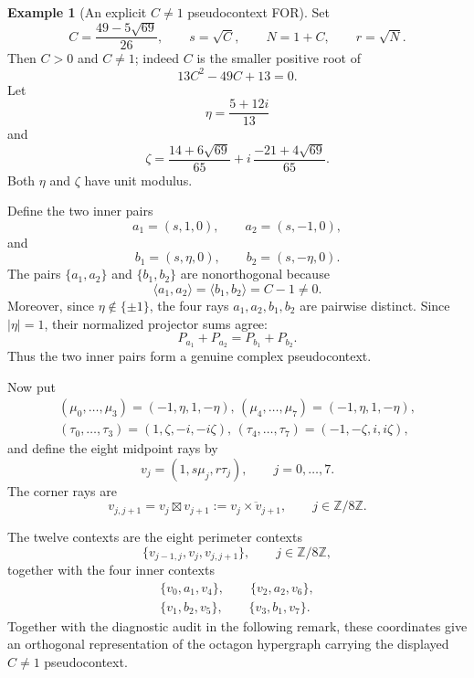 \documentclass[
  twocolumn,
  aps,
  pra,
  floatfix,
  amsmath,amssymb,
  longbibliography
]{revtex4-2}
\theoremstyle{definition}
\newtheorem{example}[theorem]{Example}
\theoremstyle{remark}
\begin{document}
\begin{example}[An explicit \(C\neq1\) pseudocontext FOR]
\label{ex:octagon_Cneq1_pseudocontext_FOR}
Set
\[
  C=\frac{49-5\sqrt{69}}{26},
  \qquad
  s=\sqrt C,
  \qquad
  N=1+C,
  \qquad
  r=\sqrt N .
\]
Then \(C>0\) and \(C\neq1\); indeed \(C\) is the smaller positive root of
\[
  13C^2-49C+13=0 .
\]
Let
\[
  \eta=\frac{5+12i}{13}
\]
and
\[
  \zeta=
  \frac{14+6\sqrt{69}}{65}
  +i\,\frac{-21+4\sqrt{69}}{65}.
\]
Both \(\eta\) and \(\zeta\) have unit modulus.

Define the two inner pairs
\[
  a_1=(s,1,0),\qquad a_2=(s,-1,0),
\]
and
\[
  b_1=(s,\eta,0),\qquad b_2=(s,-\eta,0).
\]
The pairs \(\{a_1,a_2\}\) and \(\{b_1,b_2\}\) are nonorthogonal because
\[
  \langle a_1,a_2\rangle
  =
  \langle b_1,b_2\rangle
  =
  C-1\neq0 .
\]
Moreover, since \(\eta\notin\{\pm1\}\), the four rays
\(a_1,a_2,b_1,b_2\) are pairwise distinct.  Since \(|\eta|=1\), their
normalized projector sums agree:
\[
  P_{a_1}+P_{a_2}=P_{b_1}+P_{b_2}.
\]
Thus the two inner pairs form a genuine complex pseudocontext.

Now put
\[
\begin{gathered}
  (\mu_0,\ldots,\mu_3)=(-1,\eta,1,-\eta),
  \,
  (\mu_4,\ldots,\mu_7)=(-1,\eta,1,-\eta),\\
  (\tau_0,\ldots,\tau_3)=(1,\zeta,-i,-i\zeta),
  \,
  (\tau_4,\ldots,\tau_7)=(-1,-\zeta,i,i\zeta),
\end{gathered}
\]
and define the eight midpoint rays by
\[
  v_j=(1,s\mu_j,r\tau_j),
  \qquad j=0,\ldots,7 .
\]
The corner rays are
\[
  v_{j,j+1}=v_j\boxtimes v_{j+1}:=\overline{v_j\times v_{j+1}},
  \qquad j\in\mathbb Z/8\mathbb Z.
\]

The twelve contexts are the eight perimeter contexts
\[
  \{v_{j-1,j},v_j,v_{j,j+1}\},
  \qquad j\in\mathbb Z/8\mathbb Z,
\]
together with the four inner contexts
\[
\begin{gathered}
  \{v_0,a_1,v_4\},\qquad
  \{v_2,a_2,v_6\},\\
  \{v_1,b_2,v_5\},\qquad
  \{v_3,b_1,v_7\}.
\end{gathered}
\]
Together with the diagnostic audit in the following remark, these
coordinates give an orthogonal representation of the octagon
hypergraph carrying the displayed \(C\neq1\) pseudocontext.
\end{example}
\end{document}
